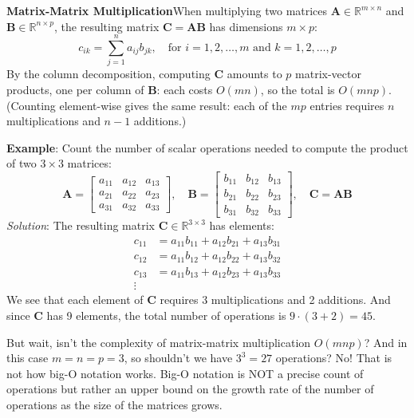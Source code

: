\textbf{Matrix-Matrix Multiplication}\quad When multiplying two matrices $ \mathbf{A} \in \mathbb{R}^{m \times n} $ and $ \mathbf{B} \in \mathbb{R}^{n \times p} $, the resulting matrix $ \mathbf{C} = \mathbf{A}\mathbf{B} $ has dimensions $ m \times p $:
\begin{equation*}
    c_{ik} = \sum_{j=1}^{n} a_{ij} b_{jk}, \quad \text{for } i = 1, 2, \dots, m \text{ and } k = 1, 2, \dots, p
\end{equation*}
By the column decomposition, computing $\mathbf{C}$ amounts to $p$ matrix-vector products, one per column of $\mathbf{B}$: each costs $O(mn)$, so the total is $O(mnp)$. (Counting element-wise gives the same result: each of the $mp$ entries requires $n$ multiplications and $n-1$ additions.)


\begin{exampleBox}
    \textbf{Example}: Count the number of scalar operations needed to compute the product of two $3 \times 3$ matrices:
    \begin{equation*}
        \mathbf{A} = \begin{bmatrix}
        a_{11} & a_{12} & a_{13} \\
        a_{21} & a_{22} & a_{23} \\
        a_{31} & a_{32} & a_{33}
        \end{bmatrix}, \quad
        \mathbf{B} = \begin{bmatrix}
        b_{11} & b_{12} & b_{13} \\
        b_{21} & b_{22} & b_{23} \\
        b_{31} & b_{32} & b_{33}
        \end{bmatrix}, \quad
        \mathbf{C} = \mathbf{A}\mathbf{B}
    \end{equation*}
    \emph{Solution}: The resulting matrix $ \mathbf{C} \in \mathbb{R}^{3\times 3} $ has elements:
    \begin{align*}
        c_{11} & = a_{11}b_{11} + a_{12}b_{21} + a_{13}b_{31} \\
        c_{12} & = a_{11}b_{12} + a_{12}b_{22} + a_{13}b_{32} \\
        c_{13} & = a_{11}b_{13} + a_{12}b_{23} + a_{13}b_{33} \\
        \vdots &
    \end{align*}
    We see that each element of $ \mathbf{C} $ requires 3 multiplications and 2 additions. And since $ \mathbf{C} $ has 9 elements, the total number of operations is $ 9 \cdot (3 + 2) = 45 $. 
    
    But wait, isn't the complexity of matrix-matrix multiplication $ O(mnp) $? And in this case $m = n = p = 3$, so shouldn't we have $3^3 = 27$ operations? No! That is not how big-O notation works. Big-O notation is NOT a precise count of operations but rather an upper bound on the growth rate of the number of operations as the size of the matrices grows.
\end{exampleBox}

